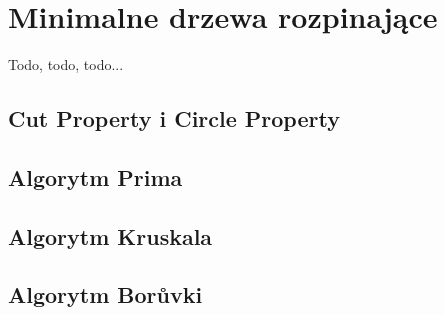 \section{Minimalne drzewa rozpinające}

Todo, todo, todo...

\subsection{Cut Property i Circle Property}

\subsection{Algorytm Prima}

\subsection{Algorytm Kruskala}

\subsection{Algorytm Borůvki}